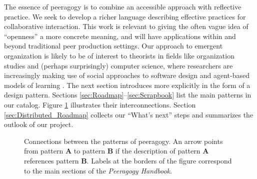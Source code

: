 The essence of peeragogy is to combine an accessible approach with reflective practice.   We seek to develop a richer language describing effective practices for collaborative interaction.  This work is relevant to giving the often vague idea of ``openness'' a more concrete meaning, and will have applications within and beyond traditional peer production settings.  Our approach to emergent organization is likely to be of interest to theorists in fields like organization studies and (perhaps surprisingly) computer science, where researchers are increasingly making use of social approaches to software design and agent-based models of learning \cite{minsky1967programming,poetry-workshop}.  The next section introduces  more explicitly in the form of a design pattern.  Sections \ref{sec:Roadmap}--\ref{sec:Scrapbook} list the main patterns in our catalog.    Figure \ref{fig:connections} illustrates their interconnections.  Section \ref{sec:Distributed_Roadmap} collects our ``What's next'' steps and summarizes the outlook of our project.

\begin{figure}
\vspace{-.9in}
{\centering


\par
}
\vspace{-.9in}
\caption{Connections between the patterns of peeragogy.  An arrow points from pattern \textbf{A} to pattern \textbf{B} if the description of pattern \textbf{A} references pattern \textbf{B}. Labels at the borders of the figure correspond to the main sections of the \emph{Peeragogy Handbook}.\label{fig:connections}}
\end{figure}


    
    
    
    
    
    
    

    
    
    
    
    
    
    
    
    
    
    
    
    
    
    
    
    
    
    
    
    
